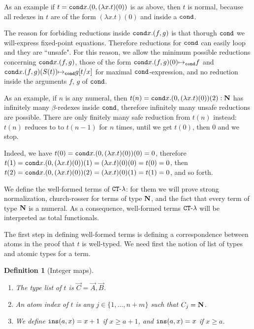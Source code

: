 \documentclass{article}
\newtheorem{definition}[theorem]{Definition}
\begin{document}
As an example if $t = {\tt cond} x. (0, (\lambda x.t)(0) )$ is as above, then $t$ is normal, because
all redexes in $t$ are of the form  $(\lambda x.t)(0)$ and inside a ${\tt cond}$. 

The reason for forbiding
reductions inside ${\tt cond} x.(f,g)$ is that thorugh ${\tt cond}$ we will-express fixed-point equations.
Therefore reductions for ${\tt cond}$ can easily loop and they are ``unsafe". For this reason, we allow 
the minimum possible reductions concerning ${\tt cond} x.(f,g)$, those of the form
${\tt cond} x.(f,g)(0) {\mapsto}_{\tt cond} f$ and
${\tt cond} x.(f,g)(S(t)) {\mapsto}_{\tt cond} g[t/x]$ for maximal ${\tt cond}$-expression, and no reduction
inside the arguments $f$, $g$ of ${\tt cond}$.

As an example, if $n$ is any numeral, then 
$t(n) = {\tt cond} x. (0, (\lambda x.t)(0) )(2) : {\bf N}$ has infinitely many $\beta$-redexes inside 
${\tt cond}$, therefore infinitely many unsafe reductions are possible. There are only finitely many safe reduction
from $t(n)$ instead: $t(n)$ reduces to to $t(n-1)$ for $n$ times, until we get $t(0)$, then $0$ and we stop. 

Indeed, we have $t(0) = {\tt cond} x. (0, (\lambda x.t)(0) )(0) = 0$, therefore 
$t(1) = {\tt cond} x. (0, (\lambda x.t)(0) )(1) = (\lambda x.t)(0)(0) = t(0) = 0$,
then $t(2) =  {\tt cond} x. (0, (\lambda x.t)(0) )(2) = (\lambda x.t)(0)(1) = t(1) = 0$, and so forth.

We define the well-formed terms of ${ {\tt CT} \mbox{-} \lambda}$: for them we will prove
strong normalization, church-rosser for terms of type ${\bf N}$, and the fact that every term of type
${\bf N}$ is a numeral. 
As a consequence, well-formed terms ${ {\tt CT} \mbox{-} \lambda}$ will be interpreted as total functionals. 

The first step in defining well-formed terms is defining a correspondence between atoms in the
proof that $t$ is well-typed. We need first the notion of list of types and atomic types for a term.

\begin{definition}[Integer maps]
\begin{enumerate}
\item
The type list of $t$ is $\vec{C} = \vec{A},\vec{B}$. 

\item
An atom index of $t$ is any $j \in \{1, \ldots, n+m\}$ such that $C_j = {\bf N}$.

\item
We define ${\tt ins}(a,x)=x+1$ if $x \ge a+1$, and ${\tt ins}(a,x)=x$ if $x\ge a$.

\end{enumerate}
\end{definition}
\end{document}
